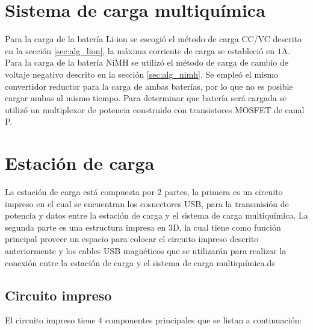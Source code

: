 \chapter{Sistema de carga multiquímica}

Para la carga de la batería Li-ion se escogió el método de carga CC/VC
descrito en la sección \ref{sec:alg_lion}, la máxima corriente de carga
se estableció en $1\text{A}$. Para la carga de la batería NiMH se utilizó
el método de carga de cambio de voltaje negativo descrito en la sección 
\ref{sec:alg_nimh}. Se empleó el mismo convertidor reductor para la carga
de ambas baterías, por lo que no es posible cargar ambas al mismo tiempo.
Para determinar que batería será cargada se utilizó un multiplexor de potencia
construido con transistores MOSFET de canal P.
    

    
    
    

    

    

    

    
    
    



    
        

\chapter{Estación de carga}

La estación de carga está compuesta por 2 partes, la primera es un circuito impreso
en el cual se encuentran los cosnectores USB, para la transmisión de potencia y 
datos entre la estación de carga y el sistema de carga multiquímica. La segunda
parte es una estructura impresa en 3D, la cual tiene como función principal
proveer un espacio para colocar el circuito impreso descrito anteriormente y 
los cables USB magnéticos que se utilizarán para realizar la conexión entre
la estación de carga y el sistema de carga multiquímica.ds


\section{Circuito impreso}

El circuito impreso tiene 4 componentes principales que se listan a continuación:

